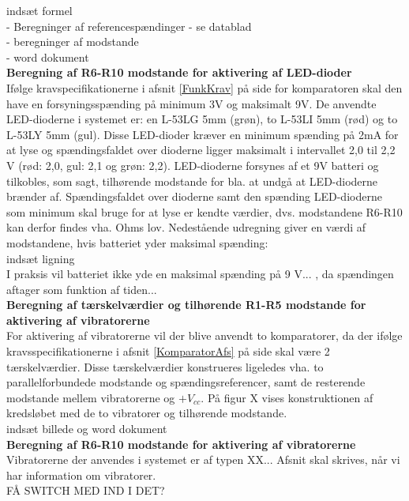 indsæt formel \\

- Beregninger af referencespændinger - se datablad \\
- beregninger af modstande \\
- word dokument \\

\noindent\textbf{Beregning af R6-R10 modstande for aktivering af LED-dioder} \\
Ifølge kravspecifikationerne i afsnit \ref{FunkKrav}  på side \pageref{FunkKrav} for komparatoren skal den have en forsyningsspænding på minimum 3V og maksimalt 9V. %
De anvendte LED-dioderne i systemet er: en L-53LG 5mm (grøn), to L-53LI 5mm (rød) og to L-53LY 5mm (gul). Disse LED-dioder kræver en minimum spænding på 2mA for at lyse og spændingsfaldet over dioderne ligger maksimalt i intervallet 2,0 til 2,2 V (rød: 2,0, gul: 2,1 og grøn: 2,2). LED-dioderne forsynes af et 9V batteri og tilkobles, som sagt, tilhørende modstande for bla. at undgå at LED-dioderne brænder af. Spændingsfaldet over dioderne samt den spænding LED-dioderne som minimum skal bruge for at lyse er kendte værdier, dvs. modstandene R6-R10 kan derfor findes vha. Ohms lov. Nedestående udregning giver en værdi af modstandene, hvis batteriet yder maksimal spænding: \\

indsæt ligning \\

I praksis vil batteriet ikke yde en maksimal spænding på 9 V... , da spændingen aftager som funktion af tiden... \\

\noindent\textbf{Beregning af tærskelværdier og tilhørende R1-R5 modstande for aktivering af  vibratorerne} \\
For aktivering af vibratorerne vil der blive anvendt to komparatorer, da der ifølge kravsspecifikationerne i afsnit \ref{KomparatorAfs} på side \pageref{KomparatorAfs} skal være 2 tærskelværdier. Disse tærskelværdier konstrueres ligeledes vha. to parallelforbundede modstande og spændingsreferencer, samt de resterende modstande mellem vibratorerne og $+V_{cc}$. På figur X vises konstruktionen af kredsløbet med de to vibratorer og tilhørende modstande. \\

indsæt billede og word dokument \\

\noindent\textbf{Beregning af R6-R10 modstande for aktivering af vibratorerne} \\
Vibratorerne der anvendes i systemet er af typen XX... Afsnit skal skrives, når vi har information om vibratorer.  \\

FÅ SWITCH MED IND I DET? \\